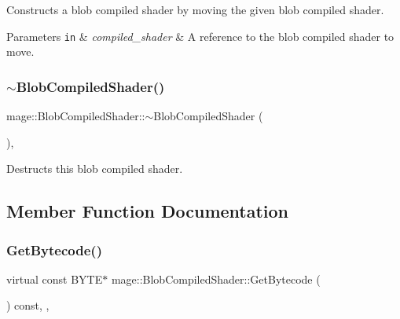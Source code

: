 Constructs a blob compiled shader by moving the given blob compiled shader.


\begin{DoxyParams}[1]{Parameters}
\mbox{\tt in}  & {\em compiled\+\_\+shader} & A reference to the blob compiled shader to move. \\
\hline
\end{DoxyParams}
\hypertarget{classmage_1_1_blob_compiled_shader_a75f98c42b9a17980146b7308080394a5}{}\label{classmage_1_1_blob_compiled_shader_a75f98c42b9a17980146b7308080394a5} 
\subsubsection{\texorpdfstring{$\sim$\+Blob\+Compiled\+Shader()}{~BlobCompiledShader()}}
{\footnotesize\ttfamily mage\+::\+Blob\+Compiled\+Shader\+::$\sim$\+Blob\+Compiled\+Shader (\begin{DoxyParamCaption}{ }\end{DoxyParamCaption})\hspace{0.3cm}{\ttfamily [virtual]}, {\ttfamily [default]}}

Destructs this blob compiled shader. 

\subsection{Member Function Documentation}
\hypertarget{classmage_1_1_blob_compiled_shader_a44cc21b9ab038c57155e64e8ced4d504}{}\label{classmage_1_1_blob_compiled_shader_a44cc21b9ab038c57155e64e8ced4d504} 
\subsubsection{\texorpdfstring{Get\+Bytecode()}{GetBytecode()}}
{\footnotesize\ttfamily virtual const B\+Y\+TE$\ast$ mage\+::\+Blob\+Compiled\+Shader\+::\+Get\+Bytecode (\begin{DoxyParamCaption}{ }\end{DoxyParamCaption}) const\hspace{0.3cm}{\ttfamily [override]}, {\ttfamily [virtual]}, {\ttfamily [noexcept]}}

